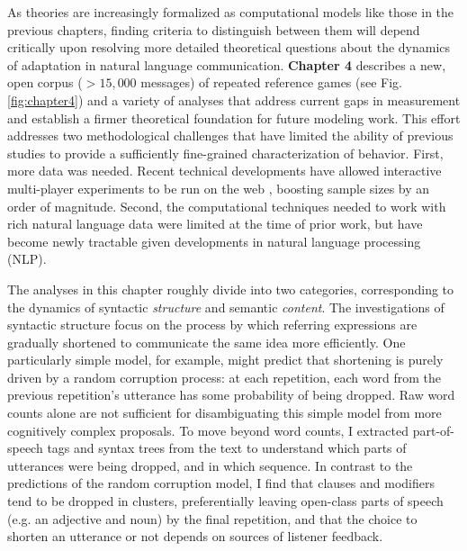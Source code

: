 \documentclass[11pt]{article}
\begin{document}
As theories are increasingly formalized as computational models like those in the previous chapters, finding criteria to distinguish between them will depend critically upon resolving more detailed theoretical questions about the dynamics of adaptation in natural language communication.
\textbf{Chapter 4} describes a new, open corpus ($> 15,000$ messages) of repeated reference games (see Fig. \ref{fig:chapter4}) and a variety of analyses that address current gaps in measurement and establish a firmer theoretical foundation for future modeling work.
This effort addresses two methodological challenges that have limited the ability of previous studies to provide a sufficiently fine-grained characterization of behavior.
First, more data was needed.
Recent technical developments have allowed interactive multi-player experiments to be run on the web \cite{Hawkins15_RealTimeWebExperiments}, boosting sample sizes by an order of magnitude.
Second, the computational techniques needed to work with rich natural language data were limited at the time of prior work, but have become newly tractable given developments in natural language processing (NLP).

The analyses in this chapter roughly divide into two categories, corresponding to the dynamics of syntactic \emph{structure} and semantic \emph{content}.
The investigations of syntactic structure focus on the process by which referring expressions are gradually shortened to communicate the same idea more efficiently.
One particularly simple model, for example, might predict that shortening is purely driven by a random corruption process: at each repetition, each word from the previous repetition's utterance has some probability of being dropped.
Raw word counts alone are not sufficient for disambiguating this simple model from more cognitively complex proposals.
To move beyond word counts, I extracted part-of-speech tags and syntax trees from the text to understand which parts of utterances were being dropped, and in which sequence.
In contrast to the predictions of the random corruption model, I find that clauses and modifiers tend to be dropped in clusters, preferentially leaving open-class parts of speech (e.g. an adjective and noun) by the final repetition, and that the choice to shorten an utterance or not depends on sources of listener feedback.  
\end{document}
